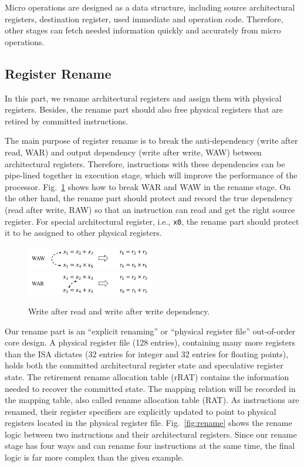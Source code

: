 Micro operations are designed as a data structure, including source architectural registers, destination register, used immediate and operation code. Therefore, other stages can fetch needed information quickly and accurately from micro operations.

\subsection{Register Rename} %
In this part, we rename architectural registers and assign them with physical registers. Besides, the rename part should also free physical registers that are retired by committed instructions.

The main purpose of register rename is to break the anti-dependency (write after read, WAR) and output dependency (write after write, WAW) between architectural registers. Therefore, instructions with these dependencies can be pipe-lined together in execution stage, which will improve the performance of the processor. Fig.~\ref{fig:waw_war} shows how to break WAR and WAW in the rename stage. On the other hand, the rename part should protect and record the true dependency (read after write, RAW) so that an instruction can read and get the right source register. For special architectural register, i.e., \texttt{x0}, the rename part should protect it to be assigned to other physical registers.

\begin{figure}[!htp]
    \centering
    \includegraphics[width=0.5\textwidth]{figure/waw.png}
    \includegraphics[width=0.5\textwidth]{figure/war.png}
    \caption{Write after read and write after write dependency.}
    \label{fig:waw_war}
\end{figure}

Our rename part is an ``explicit renaming'' or ``physical register file'' out-of-order core design. A physical register file (128 entries), containing many more registers than the ISA dictates (32 entries for integer and 32 entries for floating points), holds both the committed architectural register state and speculative register state. The retirement rename allocation table (rRAT) contains the information needed to recover the committed state. The mapping relation will be recorded in the mapping table, also called rename allocation table (RAT). As instructions are renamed, their register specifiers are explicitly updated to point to physical registers located in the physical register file. Fig.~\ref{fig:rename} shows the rename logic between two instructions and their architectural registers. Since our rename stage has four ways and can rename four instructions at the same time, the final logic is far more complex than the given example.

